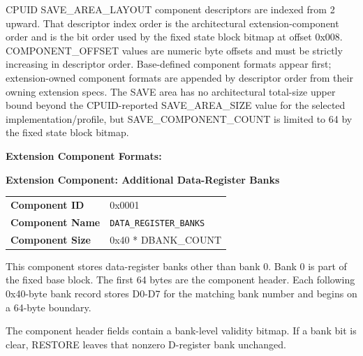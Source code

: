 \documentclass[10pt,twoside]{article}
\begin{document}
\noindent CPUID SAVE\_AREA\_LAYOUT component descriptors are indexed from 2 upward. That descriptor index order is the architectural extension-component order and is the bit order used by the fixed state block bitmap at offset 0x008. COMPONENT\_OFFSET values are numeric byte offsets and must be strictly increasing in descriptor order. Base-defined component formats appear first; extension-owned component formats are appended by descriptor order from their owning extension specs. The SAVE area has no architectural total-size upper bound beyond the CPUID-reported SAVE\_AREA\_SIZE value for the selected implementation/profile, but SAVE\_COMPONENT\_COUNT is limited to 64 by the fixed state block bitmap.\par
\par\smallskip\noindent\textbf{Extension Component Formats:}\par
\par\smallskip\Needspace{2.4in}
\noindent\textbf{Extension Component: Additional Data-Register Banks}\par\smallskip
\begingroup\footnotesize
\begin{tabularx}{0.985\linewidth}{@{}p{1.35in}X@{}}
\textbf{Component ID} & 0x0001\\
\textbf{Component Name} & \texttt{DATA\_REGISTER\_BANKS}\\
\textbf{Component Size} & 0x40 * DBANK\_COUNT\\
\end{tabularx}\endgroup\par\smallskip
\noindent This component stores data-register banks other than bank 0. Bank 0 is part of the fixed base block. The first 64 bytes are the component header. Each following 0x40-byte bank record stores D0-D7 for the matching bank number and begins on a 64-byte boundary.\par\smallskip
\noindent The component header fields contain a bank-level validity bitmap. If a bank bit is clear, RESTORE leaves that nonzero D-register bank unchanged.\par\smallskip
\Needspace{1.48in}
\end{document}
